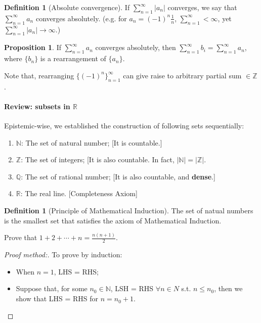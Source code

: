 \documentclass[12pt]{article}
\newcommand{\N}{{\mathbb N}}
\newcommand{\Q}{{\mathbb Q}}
\newcommand{\R}{{\mathbb R}}
\newcommand{\Z}{{\mathbb Z}}
\theoremstyle{definition}
\newtheorem{definition}[theorem]{Definition}
\newtheorem{proposition}[theorem]{Proposition}
\theoremstyle{plain}
\begin{document}
\begin{definition}
    [Absolute convergence]
    If $\sum_{n=1}^\infty |a_n|$ converges, we say that $\sum_{n=1}^\infty a_n$
    converges absolutely.
    (e.g. for $a_n = (-1)^n \frac{1}{n}$, $\sum_{n=1}^\infty < \infty$, yet
    $\sum_{n=1}^\infty |a_n| \to \infty$.)
\end{definition}

\begin{proposition}
    If $\sum_{n=1}^\infty a_n$ converges absolutely, then $\sum_{n=1}^\infty b_i
    = \sum_{n=1}^\infty a_n$, where $\{b_n\}$ is a rearrangement of $\{a_n\}$.

    Note that, rearranging $\{(-1)^n\}_{n=1}^\infty$ can give raise to arbitrary
    partial sum $\in \Z$.
\end{proposition}

\paragraph{Review: subsets in $\R$}
Epistemic-wise, we established the construction of following sets sequentially:
\begin{enumerate}
    \item $\N$: The set of natural number; [It is countable.]
    \item $\Z$: The set of integers; [It is also countable. In fact, $|\N| = |\Z|$.
    \item $\Q$: The set of rational number; [It is also countable, and
        \textbf{dense}.]
    \item $\R$: The real line. [Completeness Axiom]
\end{enumerate}

\begin{definition}
    [Principle of Mathematical Induction]
    The set of natual numbers is the smallest set that satisfies the axiom of
    Mathematical Induction.

    \begin{example}
        Prove that $1 + 2 + \cdots + n = \frac{n(n+1)}{2}$.
        \begin{proof}[Proof method:]
            To prove by induction:
            \begin{itemize}
                \item When $n = 1$, LHS = RHS;
                \item Suppose that, for some $n_0 \in \N$, LSH = RHS $\forall n \in N$ s.t. $n \le n_0$, then
                    we show that LHS = RHS for $n = n_0 + 1$.
            \end{itemize}
        \end{proof}
    \end{example}
\end{definition}
\end{document}
